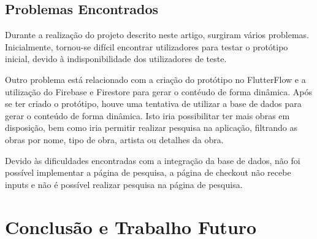 \documentclass[conference]{IEEEtran}
\begin{document}
\subsection{Problemas Encontrados}

Durante a realização do projeto descrito neste artigo, surgiram vários problemas. Inicialmente, tornou-se difícil 
encontrar utilizadores para testar o protótipo inicial, devido à indisponibilidade dos utilizadores de teste. 

Outro problema está relacionado com a criação do protótipo no FlutterFlow 
e a utilização do Firebase e Firestore para gerar o contéudo de forma dinâmica. 
Após se ter criado o protótipo, houve uma tentativa de utilizar a base de dados para 
gerar o conteúdo de forma dinâmica. Isto iria possibilitar ter mais obras em disposição, 
bem como iria permitir realizar pesquisa na aplicação, filtrando as obras por nome, 
tipo de obra, artista ou detalhes da obra.

Devido às dificuldades encontradas com a integração da base de dados, 
não foi possível implementar a página de pesquisa, a página de checkout não 
recebe inputs e não é possível realizar pesquisa na página de pesquisa.


\section{Conclusão e Trabalho Futuro}



\end{document}
